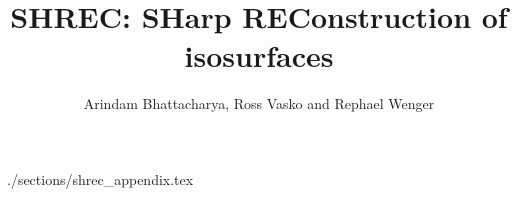 \documentclass{vgtc}
\title{SHREC: SHarp REConstruction of isosurfaces}
\author{Arindam Bhattacharya, Ross Vasko and Rephael Wenger}
\begin{document}











 {./sections/shrec_appendix.tex}
\end{document}
